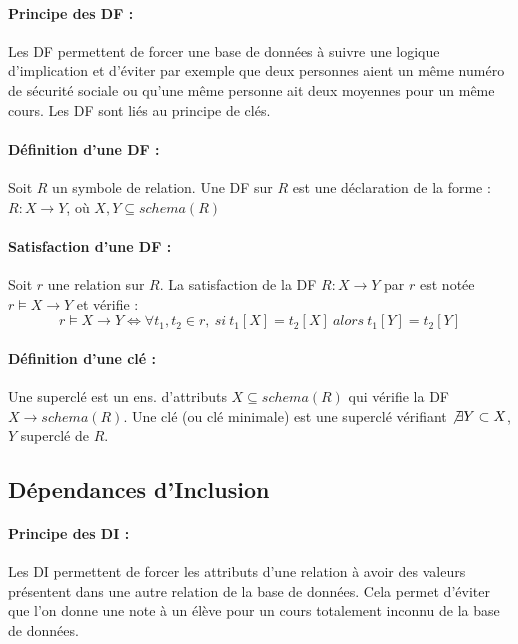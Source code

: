 \documentclass[10pt,a4paper]{article}
\begin{document}
\paragraph{Principe des DF :} Les DF permettent de forcer une base de données à suivre une logique d'implication et d'éviter par exemple que deux personnes aient un même numéro de sécurité sociale ou qu'une même personne ait deux moyennes pour un même cours. Les DF sont liés au principe de clés.

\paragraph{Définition d'une DF :} Soit $R$ un symbole de relation. Une DF sur $R$ est une déclaration de la forme : $R : X \rightarrow Y$, où $X,Y \subseteq schema(R)$\\

\paragraph{Satisfaction d'une DF :} Soit $r$ une relation sur $R$. La satisfaction de la DF $R : X \rightarrow Y$ par $r$ est notée $r \models X \rightarrow Y$ et vérifie : 
$$r \models X \rightarrow Y \Leftrightarrow \forall t_{1},t_{2} \in r, \ si \ t_{1}[X]=t_{2}[X] \ alors \  t_{1}[Y]=t_{2}[Y]$$

\paragraph{Définition d'une clé :} Une superclé est un ens. d'attributs $X \subseteq schema(R)$ qui vérifie la DF $X \rightarrow schema(R)$. Une clé (ou clé minimale) est une superclé vérifiant $ \not\exists Y \subset X$, $Y$ superclé de $R$.



\subsection{Dépendances d'Inclusion}

\paragraph{Principe des DI :} Les DI permettent de forcer les attributs d'une relation à avoir des valeurs présentent dans une autre relation de la base de données. Cela permet d'éviter que l'on donne une note à un élève pour un cours totalement inconnu de la base de données.
\end{document}
